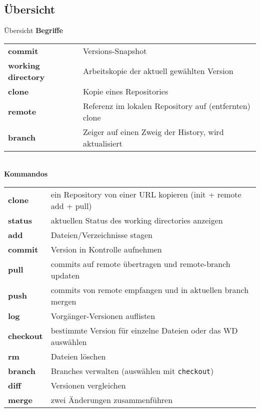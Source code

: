 \subsection{Übersicht}
\begin{frame}{Übersicht}
    \textbf{Begriffe}\\[0.5em]

    {\scriptsize
        \begin{tabular}{p{2.5cm}l}
            \textbf{commit}
                & Versions-Snapshot\\
            \textbf{working directory}
                & Arbeitskopie der aktuell gewählten Version\\
            \textbf{clone}
                & Kopie eines Repositories\\
            \textbf{remote}
                & Referenz im lokalen Repository auf (entfernten) clone\\
            \textbf{branch}
                & Zeiger auf einen Zweig der History, wird aktualisiert\\
        \end{tabular}
    }\\[1em]

    \textbf{Kommandos}\\[0.5em]

    {\scriptsize
        \begin{tabular}{p{2.5cm}l}
            \textbf{clone}
                & ein Repository von einer URL kopieren (init + remote add + pull)\\
            \textbf{status}
                & aktuellen Status des working directories anzeigen\\
            \textbf{add}
                & Dateien/Verzeichnisse stagen\\
            \textbf{commit}
                & Version in Kontrolle aufnehmen\\
            \textbf{pull}
                & commits auf remote übertragen und remote-branch updaten\\
            \textbf{push}
                & commits von remote empfangen und in aktuellen branch mergen\\
            \textbf{log}
                & Vorgänger-Versionen auflisten\\
            \textbf{checkout}
                & bestimmte Version für einzelne Dateien oder
                das WD auswählen\\
            \textbf{rm}
                & Dateien löschen\\
            \textbf{branch}
                & Branches verwalten (auswählen mit \texttt{checkout})\\
            \textbf{diff}
                & Versionen vergleichen\\
            \textbf{merge}
                & zwei Änderungen zusammenführen\\
        \end{tabular}
    }
\end{frame}

